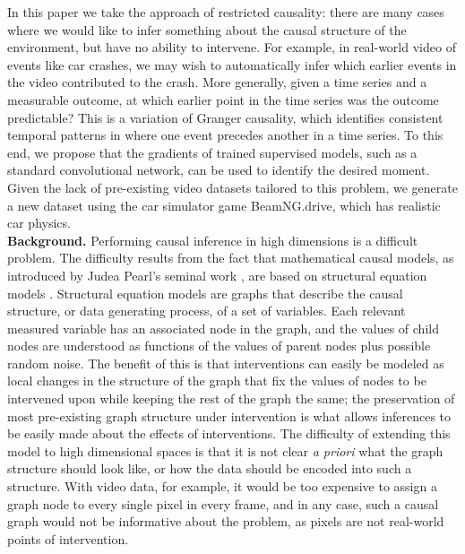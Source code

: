 \documentclass[letterpaper]{article} %
\begin{document}
In this paper we take the approach of restricted causality: there are many cases where we would like to infer something about the causal structure of the environment, but have no ability to intervene. For example, in real-world video of events like car crashes, we may wish to automatically infer which earlier events in the video contributed to the crash. More generally, given a time series and a measurable outcome, at which earlier point in the time series was the outcome predictable? This is a variation of Granger causality, which identifies consistent temporal patterns in where one event precedes another in a time series. To this end, we propose that the gradients of trained supervised models, such as a standard convolutional network, can be used to identify the desired moment. Given the lack of pre-existing video datasets tailored to this problem, we generate a new dataset using the car simulator game BeamNG.drive, which has realistic car physics. \\


\noindent \textbf{Background.} Performing causal inference in high dimensions is a difficult problem. The difficulty results from the fact that mathematical causal models, as introduced by Judea Pearl's seminal work \cite{pearl2009causalitybook}, are based on structural equation models \cite{duncan2014introduction}. Structural equation models are graphs that describe the causal structure, or data generating process, of a set of variables.  Each relevant measured variable has an associated node in the graph, and the values of child nodes are understood as functions of the values of parent nodes plus possible random noise. The benefit of this is that interventions can easily be modeled as local changes in the structure of the graph that fix the values of nodes to be intervened upon while keeping the rest of the graph the same; the preservation of most pre-existing graph structure under intervention is what allows inferences to be easily made about the effects of interventions. The difficulty of extending this model to high dimensional spaces is that it is not clear \emph{a priori} what the graph structure should look like, or how the data should be encoded into such a structure. With video data, for example, it would be too expensive to assign a graph node to every single pixel in every frame, and in any case, such a causal graph would not be informative about the problem, as pixels are not real-world points of intervention.
\end{document}

